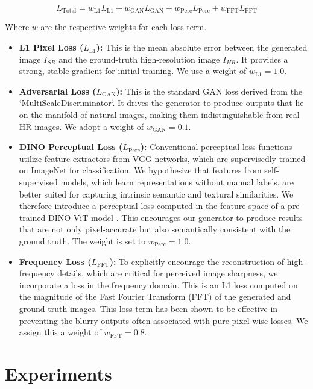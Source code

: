 \documentclass{article}
\begin{document}
\[ L_{\text{Total}} = w_{\text{L1}} L_{\text{L1}} + w_{\text{GAN}} L_{\text{GAN}} + w_{\text{Perc}} L_{\text{Perc}} + w_{\text{FFT}} L_{\text{FFT}} \]

Where $w$ are the respective weights for each loss term.

\begin{itemize}
    \item \textbf{L1 Pixel Loss ($L_{\text{L1}}$):} This is the mean absolute error between the generated image $I_{SR}$ and the ground-truth high-resolution image $I_{HR}$. It provides a strong, stable gradient for initial training. We use a weight of $w_{\text{L1}} = 1.0$.
    \item \textbf{Adversarial Loss ($L_{\text{GAN}}$):} This is the standard GAN loss derived from the `MultiScaleDiscriminator`. It drives the generator to produce outputs that lie on the manifold of natural images, making them indistinguishable from real HR images. We adopt a weight of $w_{\text{GAN}} = 0.1$.
    \item \textbf{DINO Perceptual Loss ($L_{\text{Perc}}$):} Conventional perceptual loss functions utilize feature extractors from VGG networks, which are supervisedly trained on ImageNet for classification. We hypothesize that features from self-supervised models, which learn representations without manual labels, are better suited for capturing intrinsic semantic and textural similarities. We therefore introduce a perceptual loss computed in the feature space of a pre-trained DINO-ViT model \cite{dino}. This encourages our generator to produce results that are not only pixel-accurate but also semantically consistent with the ground truth. The weight is set to $w_{\text{Perc}} = 1.0$.
    \item \textbf{Frequency Loss ($L_{\text{FFT}}$):} To explicitly encourage the reconstruction of high-frequency details, which are critical for perceived image sharpness, we incorporate a loss in the frequency domain. This is an L1 loss computed on the magnitude of the Fast Fourier Transform (FFT) of the generated and ground-truth images. This loss term has been shown to be effective in preventing the blurry outputs often associated with pure pixel-wise losses. We assign this a weight of $w_{\text{FFT}} = 0.8$.
\end{itemize}

\section{Experiments}
\end{document}
